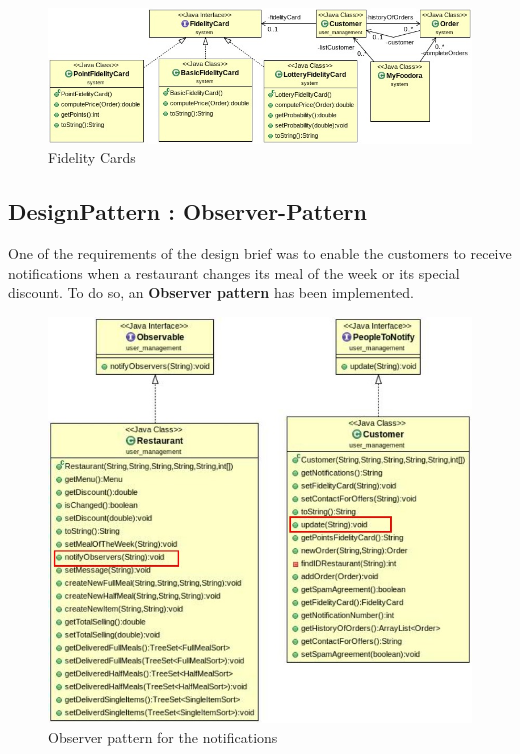 \begin{figure}[H]
	\centering
	\includegraphics[width=1\linewidth]{./ima/fidelitycard.jpg}
	\caption{Fidelity Cards}
	\label{fig:fidelitycards}
\end{figure}

\subsection{DesignPattern : Observer-Pattern}
\label{sub:designpattern_observer_pattern}
One of the requirements of the design brief was to enable the customers to receive notifications when a restaurant changes its meal of the week or its special discount. To do so, an \textbf{Observer pattern} has been implemented.

\begin{figure}[H]
	\centering
	\includegraphics[width=1\linewidth]{./ima/observerV2.jpg}
	\caption{Observer pattern for the notifications}
	\label{fig:./ima/observer}
\end{figure}

